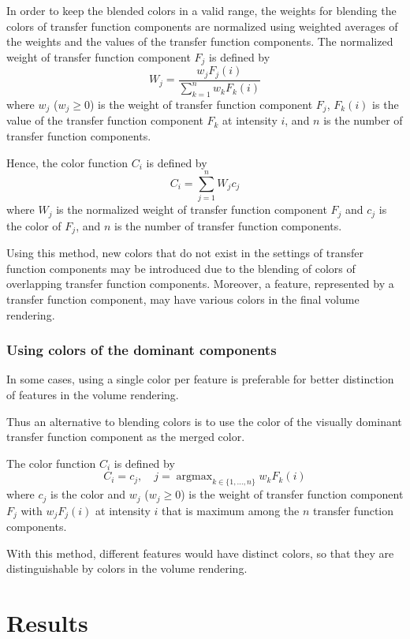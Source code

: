 \documentclass[twoside,twocolumn,10pt]{article}
\DeclareMathOperator*{\argmax}{argmax} %
\begin{document}
In order to keep the blended colors in a valid range, the weights for blending the colors of transfer function components are normalized using weighted averages of the weights and the values of the transfer function components.
The normalized weight of transfer function component $ F_{j} $ is defined by
\[ W_{j}=
\frac{w_{j}F_{j}(i)}{\sum_{k=1}^{n}w_{k}F_{k}(i)}
\]
where $ w_{j} $ ($ w_{j} \geq 0 $) is the weight of transfer function component $ F_{j} $, $ F_{k}(i) $ is the value of the transfer function component $ F_{k} $ at intensity $ i $, and $ n $ is the number of transfer function components.

Hence, the color function $ C_{i} $ is defined by
\[ C_{i}=
\sum_{j=1}^{n} W_{j}c_{j}
\]
where $ W_{j} $ is the normalized weight of transfer function component $ F_{j} $ and $ c_{j} $ is the color of $ F_{j} $, and $ n $ is the number of transfer function components.

Using this method, new colors that do not exist in the settings of transfer function components may be introduced due to the blending of colors of overlapping transfer function components.
Moreover, a feature, represented by a transfer function component, may have various colors in the final volume rendering.

\subsubsection{Using colors of the dominant components}
In some cases, using a single color per feature is preferable for better distinction of features in the volume rendering.

Thus an alternative to blending colors is to use the color of the visually dominant transfer function component as the merged color.

The color function $ C_{i} $ is defined by
\[ 
C_{i} = c_{j},\quad j = \argmax_{k \in \{1,...,n\}} w_{k}F_{k}(i)
\]
where $ c_{j} $ is the color and $ w_{j} $ ($ w_{j} \geq 0 $) is the weight of transfer function component $ F_{j} $ with $ w_{j}F_{j}(i) $ at intensity $ i $ that is maximum among the $ n $ transfer function components.

With this method, different features would have distinct colors, so that they are distinguishable by colors in the volume rendering.

\section{Results}
\end{document}
